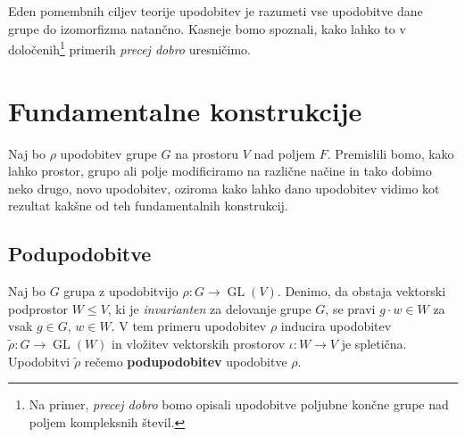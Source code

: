 \documentclass[11pt]{book}
\DeclareMathOperator\GL{GL}
\def\definicija{\color{rdeca}\bf}
\theoremstyle{definition}
\theoremstyle{zgled}
\theoremstyle{zgledbrezstevilke}
\theoremstyle{odprtproblem}
\theoremstyle{domacanaloga}
\theoremstyle{izrek}
\begin{document}
Eden pomembnih ciljev teorije upodobitev je razumeti vse upodobitve dane grupe do izomorfizma natančno. Kasneje bomo spoznali, kako lahko to v določenih\footnote{Na primer, \emph{precej dobro} bomo opisali upodobitve poljubne končne grupe nad poljem kompleksnih števil.} primerih \emph{precej dobro} uresničimo.

\section{Fundamentalne konstrukcije}

Naj bo $\rho$ upodobitev grupe $G$ na prostoru $V$ nad poljem $F$. Premislili bomo, kako lahko prostor, grupo ali polje modificiramo na različne načine in tako dobimo neko drugo, novo upodobitev, oziroma kako lahko dano upodobitev vidimo kot rezultat kakšne od teh fundamentalnih konstrukcij.


\subsection{Podupodobitve}

Naj bo $G$ grupa z upodobitvijo $\rho \colon G \to \GL(V)$. Denimo, da obstaja vektorski podprostor $W \leq V$, ki je \emph{invarianten} za delovanje grupe $G$, se pravi $g \cdot w \in W$ za vsak $g \in G$, $w \in W$. V tem primeru upodobitev $\rho$ inducira upodobitev $\tilde \rho \colon G \to \GL(W)$ in vložitev vektorskih prostorov $\iota \colon W \to V$ je spletična. Upodobitvi $\tilde \rho$ rečemo {\definicija podupodobitev} upodobitve $\rho$.
\end{document}
